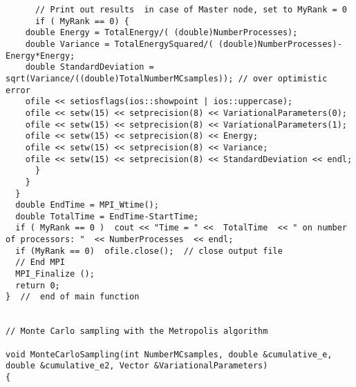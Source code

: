 \begin{verbatim}
      // Print out results  in case of Master node, set to MyRank = 0
      if ( MyRank == 0) {
	double Energy = TotalEnergy/( (double)NumberProcesses);
	double Variance = TotalEnergySquared/( (double)NumberProcesses)-Energy*Energy;
	double StandardDeviation = sqrt(Variance/((double)TotalNumberMCsamples)); // over optimistic error
	ofile << setiosflags(ios::showpoint | ios::uppercase);
	ofile << setw(15) << setprecision(8) << VariationalParameters(0);
	ofile << setw(15) << setprecision(8) << VariationalParameters(1);
	ofile << setw(15) << setprecision(8) << Energy;
	ofile << setw(15) << setprecision(8) << Variance;
	ofile << setw(15) << setprecision(8) << StandardDeviation << endl;
      }
    }
  }
  double EndTime = MPI_Wtime();
  double TotalTime = EndTime-StartTime;
  if ( MyRank == 0 )  cout << "Time = " <<  TotalTime  << " on number of processors: "  << NumberProcesses  << endl;
  if (MyRank == 0)  ofile.close();  // close output file
  // End MPI
  MPI_Finalize ();  
  return 0;
}  //  end of main function


// Monte Carlo sampling with the Metropolis algorithm  

void MonteCarloSampling(int NumberMCsamples, double &cumulative_e, double &cumulative_e2, Vector &VariationalParameters)
{


\end{verbatim}
